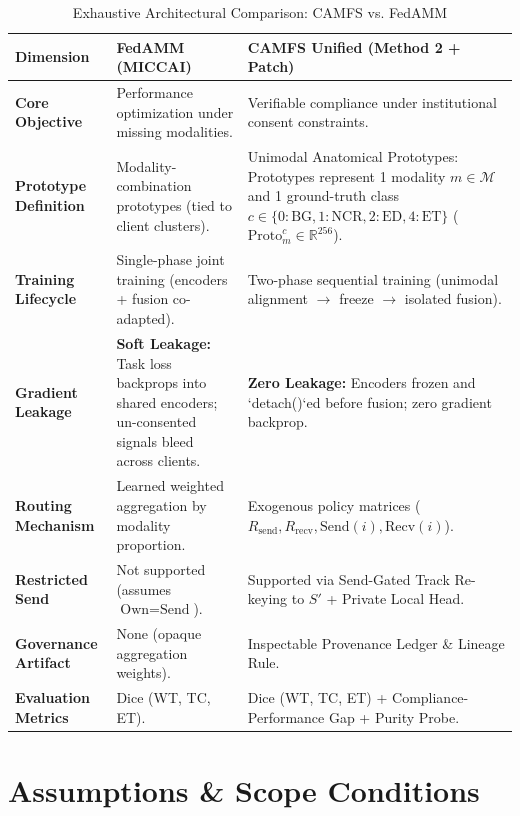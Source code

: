 \documentclass[11pt,a4paper]{article}
\begin{document}
\begin{table}[h!]
\centering
\caption{Exhaustive Architectural Comparison: CAMFS vs. FedAMM}
\label{tab:fedamm_vs_camfs}
\small
\begin{tabular}{@{}lp{6cm}p{6cm}@{}}
\toprule
\textbf{Dimension} & \textbf{FedAMM (MICCAI)} & \textbf{CAMFS Unified (Method 2 + Patch)} \\ \midrule
\textbf{Core Objective} & Performance optimization under missing modalities. & Verifiable compliance under institutional consent constraints. \\ \midrule
\textbf{Prototype Definition} & Modality-combination prototypes (tied to client clusters). & Unimodal Anatomical Prototypes: Prototypes represent 1 modality $m \in \mathcal{M}$ and 1 ground-truth class $c \in \{0:\text{BG}, 1:\text{NCR}, 2:\text{ED}, 4:\text{ET}\}$ ($\text{Proto}_m^c \in \mathbb{R}^{256}$). \\ \midrule
\textbf{Training Lifecycle} & Single-phase joint training (encoders + fusion co-adapted). & Two-phase sequential training (unimodal alignment $\to$ freeze $\to$ isolated fusion). \\ \midrule
\textbf{Gradient Leakage} & \textbf{Soft Leakage:} Task loss backprops into shared encoders; un-consented signals bleed across clients. & \textbf{Zero Leakage:} Encoders frozen and `detach()`ed before fusion; zero gradient backprop. \\ \midrule
\textbf{Routing Mechanism} & Learned weighted aggregation by modality proportion. & Exogenous policy matrices ($R_{\text{send}}, R_{\text{recv}}, \text{Send}(i), \text{Recv}(i)$). \\ \midrule
\textbf{Restricted Send} & Not supported (assumes $\text{Own} = \text{Send}$). & Supported via Send-Gated Track Re-keying to $S'$ + Private Local Head. \\ \midrule
\textbf{Governance Artifact} & None (opaque aggregation weights). & Inspectable Provenance Ledger \& Lineage Rule. \\ \midrule
\textbf{Evaluation Metrics} & Dice (WT, TC, ET). & Dice (WT, TC, ET) + Compliance-Performance Gap + Purity Probe. \\ \bottomrule
\end{tabular}
\end{table}

\newpage

\section{Assumptions \& Scope Conditions}
\end{document}
